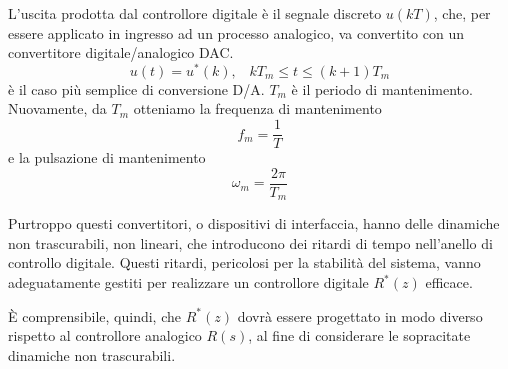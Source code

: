 \documentclass[a4paper]{report}
\begin{document}
L'uscita prodotta dal controllore digitale \`e il segnale discreto
$u(kT)$, che, per essere applicato in ingresso ad un processo
analogico, va convertito con un convertitore digitale/analogico DAC.
\[
u(t) = u^{*}(k), \;\;\; kT_m \leq t \leq (k + 1)T_m
\]
\`e il caso pi\`u semplice di conversione D/A. $T_m$ \`e il periodo di
mantenimento. Nuovamente, da $T_m$
otteniamo la frequenza di mantenimento
\[
f_m = \dfrac{1}{T}
\]
e la pulsazione di mantenimento
\[
\omega_m = \dfrac{2 \pi}{T_m}
\]

Purtroppo questi convertitori, o dispositivi di interfaccia, hanno
delle dinamiche non trascurabili, non lineari, che introducono dei
ritardi di tempo nell'anello di controllo digitale. Questi ritardi,
pericolosi per la stabilit\`a del sistema, vanno adeguatamente gestiti
per realizzare un controllore digitale $R^*(z)$ efficace.

\`E comprensibile, quindi, che $R^*(z)$ dovr\`a essere progettato in
modo diverso rispetto al controllore analogico $R(s)$, al fine di
considerare le sopracitate dinamiche non trascurabili.
\end{document}
